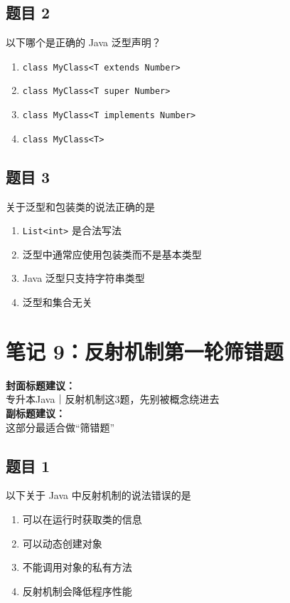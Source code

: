 \documentclass[12pt,a4paper]{ctexart}
\begin{document}
\subsection*{题目 2}
以下哪个是正确的 Java 泛型声明？
\begin{enumerate}[label=\Alph*.]
    \item \texttt{class MyClass<T extends Number>}
    \item \texttt{class MyClass<T super Number>}
    \item \texttt{class MyClass<T implements Number>}
    \item \texttt{class MyClass<T>}
\end{enumerate}

\subsection*{题目 3}
关于泛型和包装类的说法正确的是
\begin{enumerate}[label=\Alph*.]
    \item \texttt{List<int>} 是合法写法
    \item 泛型中通常应使用包装类而不是基本类型
    \item Java 泛型只支持字符串类型
    \item 泛型和集合无关
\end{enumerate}

\newpage

\section{笔记 9：反射机制第一轮筛错题}
\begin{coverbox}
\textbf{封面标题建议：}\\
专升本Java｜反射机制这3题，先别被概念绕进去\\
\textbf{副标题建议：}\\
这部分最适合做“筛错题”
\end{coverbox}

\subsection*{题目 1}
以下关于 Java 中反射机制的说法错误的是
\begin{enumerate}[label=\Alph*.]
    \item 可以在运行时获取类的信息
    \item 可以动态创建对象
    \item 不能调用对象的私有方法
    \item 反射机制会降低程序性能
\end{enumerate}
\end{document}
